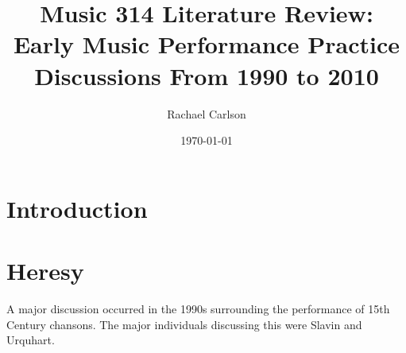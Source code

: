 \documentclass[12pt]{article}
\author{Rachael Carlson}
\title{Music 314 Literature Review: Early Music Performance Practice Discussions From 1990 to 2010}
\date{\today}
\begin{document}
\maketitle

\section{Introduction}
\label{sec:introduction}

\section{Heresy}
\label{sec:heresy}
A major discussion occurred in the 1990s surrounding the performance of 15th
Century chansons. The major individuals discussing this were
Slavin\autocite{slavin1991} and Urquhart\autocite{urquhart2011}.

\clearpage
\printbibliography
\end{document}
